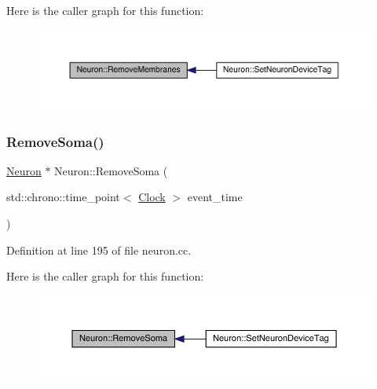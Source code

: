 Here is the caller graph for this function\+:
\nopagebreak
\begin{figure}[H]
\begin{center}
\leavevmode
\includegraphics[width=350pt]{class_neuron_a3cd5fc6f1a354d99bb8768df7ee40552_icgraph}
\end{center}
\end{figure}
\mbox{\label{class_neuron_a4f8c2f0c1b294493a7c581a7f46c2863}} 
\subsubsection{\texorpdfstring{Remove\+Soma()}{RemoveSoma()}}
{\footnotesize\ttfamily \hyperlink{class_neuron}{Neuron} $\ast$ Neuron\+::\+Remove\+Soma (\begin{DoxyParamCaption}\item[{std\+::chrono\+::time\+\_\+point$<$ \hyperlink{universe_8h_a0ef8d951d1ca5ab3cfaf7ab4c7a6fd80}{Clock} $>$}]{event\+\_\+time }\end{DoxyParamCaption})}



Definition at line 195 of file neuron.\+cc.

Here is the caller graph for this function\+:
\nopagebreak
\begin{figure}[H]
\begin{center}
\leavevmode
\includegraphics[width=350pt]{class_neuron_a4f8c2f0c1b294493a7c581a7f46c2863_icgraph}
\end{center}
\end{figure}
\mbox{\label{class_neuron_a976b1bab63d0bd21b1c8c8e1cfbd17fe}} 
